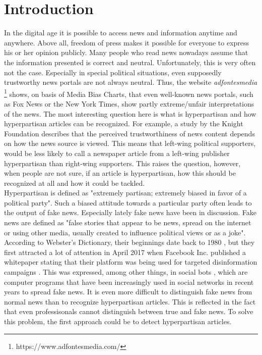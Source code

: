 \documentclass[a4paper, 11pt,titlepage,oneside,openany]{book}
\begin{document}

\newpage



\chapter{Introduction}
In the digital age it is possible to access news and information anytime and anywhere. Above all, freedom of press makes it possible for everyone to express his or her opinion publicly. Many people who read news nowadays assume that the information presented is correct and neutral. Unfortunately, this is very often not the case. Especially in special political situations, even supposedly trustworthy news portals are not always neutral.  Thus, the website \textit{adfontesmedia} \footnote{https://www.adfontesmedia.com/} shows, on basis of Media Bias Charts, that even well-known news portals, such as Fox News or the New York Times, show partly extreme/unfair interpretations of the news. The most interesting question here is what is hyperpartisan and how hyperpartisan articles can be recognized. For example, a study by the Knight Foundation \cite{study} describes that the perceived trustworthiness of news content depends on how the news source is viewed.  This means that left-wing political supporters, would be less likely to call a newspaper article from a left-wing publisher hyperpartisan than right-wing supporters. This raises the question, however, when people are not sure, if an article is hyperpartisan, how this should be recognized at all and how it could be tackled.  \\
\indent Hyperpartisan is defined as "extremely partisan; extremely biased in favor of a political party". Such a biased attitude towards a particular party often leads to the output of fake news. Especially lately fake news have been in discussion. Fake news are defined as "false stories that appear to be news, spread on the internet or using other media, usually created to influence political views or as a joke". According to Webster's Dictionary, their beginnings date back to 1980 \cite{webster}, but they first attracted a lot of attention in April 2017 when Facebook Inc. published a whitepaper stating that their platform was being used for targeted disinformation campaigns \cite{facebook}. This was expressed, among other things, in social bots \cite{socialbots}, which are computer programs that have been increasingly used in social networks in recent years to spread fake news. It is even more difficult to distinguish fake news from normal news than to recognize hyperpartisan articles. This is reflected in the fact that even professisonals cannot distinguish between true and fake news. To solve this problem, the first approach could be to detect hyperpartisan articles.  \\
\end{document}
